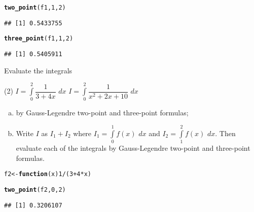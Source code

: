 \documentclass[11pt, a4paper]{article}\usepackage[]{graphicx}\usepackage[]{xcolor}
\makeatletter
\newcommand{\hlnum}[1]{\textcolor[rgb]{0.686,0.059,0.569}{#1}}%
\newcommand{\hlopt}[1]{\textcolor[rgb]{0,0,0}{#1}}%
\newcommand{\hldef}[1]{\textcolor[rgb]{0.345,0.345,0.345}{#1}}%
\newcommand{\hlkwa}[1]{\textcolor[rgb]{0.161,0.373,0.58}{\textbf{#1}}}%
\newcommand{\hlkwb}[1]{\textcolor[rgb]{0.69,0.353,0.396}{#1}}%
\newcommand{\hlkwc}[1]{\textcolor[rgb]{0.333,0.667,0.333}{#1}}%
\newcommand{\hlkwd}[1]{\textcolor[rgb]{0.737,0.353,0.396}{\textbf{#1}}}%
\newenvironment{kframe}{%
 \def\at@end@of@kframe{}%
 \ifinner\ifhmode%
  \def\at@end@of@kframe{\end{minipage}}%
  \begin{minipage}{\columnwidth}%
 \fi\fi%
 \def\FrameCommand##1{\hskip\@totalleftmargin \hskip-\fboxsep
 \colorbox{shadecolor}{##1}\hskip-\fboxsep
     \hskip-\linewidth \hskip-\@totalleftmargin \hskip\columnwidth}%
 \MakeFramed {\advance\hsize-\width
   \@totalleftmargin\z@ \linewidth\hsize
   \@setminipage}}%
 {\par\unskip\endMakeFramed%
 \at@end@of@kframe}
\newenvironment{knitrout}{}{} %
\makeatother
\begin{document}
\begin{knitrout}
\color{fgcolor}\begin{kframe}
\begin{alltt}
\hlkwd{two_point}\hldef{(f1,} \hlnum{1}\hldef{,} \hlnum{2}\hldef{)}
\end{alltt}
\begin{verbatim}
## [1] 0.5433755
\end{verbatim}
\end{kframe}
\end{knitrout}

\begin{knitrout}
\color{fgcolor}\begin{kframe}
\begin{alltt}
\hlkwd{three_point}\hldef{(f1,} \hlnum{1}\hldef{,} \hlnum{2}\hldef{)}
\end{alltt}
\begin{verbatim}
## [1] 0.5405911
\end{verbatim}
\end{kframe}
\end{knitrout}

\leftpointright \hspace{0.5cm} Evaluate the integrals
	\begin{tasks}(2)
		\task $I = \displaystyle{\int \limits_{0}^{2} \dfrac{1}{3 + 4x} \,\, dx}$
		\task $I = \displaystyle{\int \limits_{0}^{2} \dfrac{1}{x^2 + 2x + 10} \,\, dx}$
	\end{tasks}

\begin{enumerate}[(a)]

\item by Gauss-Legendre two-point and three-point formulas;

\item Write $I$ as $I_1 + I_2$ where $I_1 = \displaystyle{\int \limits_{0}^{1} f(x) \,\, dx}$ and $I_2 = \displaystyle{\int \limits_{1}^{2} f(x) \,\, dx}$. Then evaluate each of the integrals by Gauss-Legendre two-point and three-point formulas.
\end{enumerate}

\begin{knitrout}
\color{fgcolor}\begin{kframe}
\begin{alltt}
\hldef{f2} \hlkwb{<-} \hlkwa{function}\hldef{(}\hlkwc{x}\hldef{)} \hlnum{1} \hlopt{/} \hldef{(}\hlnum{3} \hlopt{+} \hlnum{4}\hlopt{*}\hldef{x)}

\hlkwd{two_point}\hldef{(f2,} \hlnum{0}\hldef{,} \hlnum{2}\hldef{)}
\end{alltt}
\begin{verbatim}
## [1] 0.3206107
\end{verbatim}
\end{kframe}
\end{knitrout}
\end{document}
